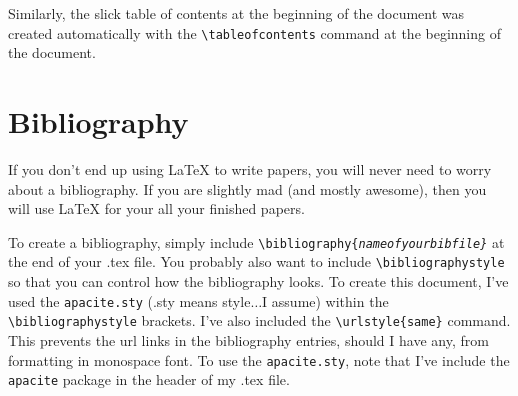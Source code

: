 \documentclass[12pt]{article}
\begin{document}
Similarly, the slick table of contents at the beginning of the
document was created automatically with the
\texttt{\textbackslash{}tableofcontents} command at the beginning of
the document.


\section{Bibliography}
If you don't end up using \LaTeX{} to write papers, you will never
need to worry about a bibliography. If you are slightly mad (and
mostly awesome), then you will use \LaTeX{} for your all your finished papers.

To create a bibliography, simply include
\texttt{\textbackslash{}bibliography\{{\itshape nameofyourbibfile\}}} at
the end of your .tex file. You probably also want to include
\texttt{\textbackslash{}bibliographystyle} so that you can control how
the bibliography looks. To create this document, I've used the
\texttt{apacite.sty} (.sty means style$\ldots$I assume) within the
\texttt{\textbackslash{}bibliographystyle} brackets. I've also
included the \texttt{\textbackslash{}urlstyle\{same\}} command. This
prevents the url links in the bibliography entries, should I have any,
from formatting in monospace font. To use the \texttt{apacite.sty},
note that I've include the \texttt{apacite} package in the header of
my .tex file.



\cleardoublepage




\cleardoublepage
\appendix
\end{document}
